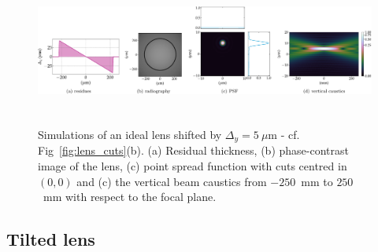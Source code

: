 \begin{refsection}
\begin{figure}[t]
        \centering
         {\includegraphics[height=4.19cm]{figures/ch04/shifted_CRL.pdf}}
        \caption[Effects of a transverse CRL offset]{Simulations of an ideal lens shifted by $\Delta_y=5~\mu$m - cf. Fig~\ref{fig:lens_cuts}(b). (a) Residual thickness, (b) phase-contrast image of the lens, (c) point spread function with cuts centred in $(0,0)$ and (c) the vertical beam caustics from $-250$~mm to $250$~mm with respect to the focal plane.} \label{fig:shifted_CRL}
\end{figure}

\subsection{Tilted lens}\label{sec:tilted_lens}


\end{refsection}
